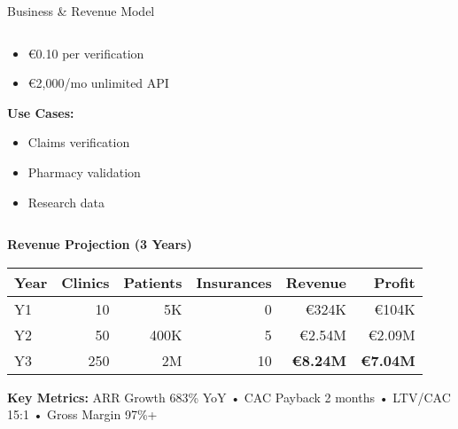 \documentclass[aspectratio=169,xcolor=dvipsnames,14pt]{beamer}
\newcommand{\checkitem}{\item[\color{SuccessGreen}\faCheckCircle]}
\begin{document}
\begin{frame}{Business \& Revenue Model}
\begin{columns}[T]
\begin{column}{0.33\textwidth}
      \begin{itemize}
        \item €0.10 per verification
        \item €2,000/mo unlimited API
      \end{itemize}

      \vspace{0.2cm}

      \textbf{Use Cases:}
      \begin{itemize}
        \checkitem Claims verification
        \checkitem Pharmacy validation
        \checkitem Research data
      \end{itemize}
    \end{column}
  \end{columns}

  \vspace{0.4cm}

  \textbf{\textcolor{FadjmaBlue}{Revenue Projection (3 Years)}}

  \begin{table}
    \small
    \begin{tabular}{lrrrrr}
      \toprule
      \textbf{Year} & \textbf{Clinics} & \textbf{Patients} & \textbf{Insurances} & \textbf{Revenue} & \textbf{Profit} \\
      \midrule
      Y1 & 10 & 5K & 0 & €324K & €104K \\
      Y2 & 50 & 400K & 5 & €2.54M & €2.09M \\
      Y3 & 250 & 2M & 10 & \textcolor{SuccessGreen}{\textbf{€8.24M}} & \textcolor{SuccessGreen}{\textbf{€7.04M}} \\
      \bottomrule
    \end{tabular}
  \end{table}

  \textbf{Key Metrics:} ARR Growth 683\% YoY • CAC Payback 2 months • LTV/CAC 15:1 • \textcolor{SuccessGreen}{Gross Margin 97\%+}

\end{frame}
\end{document}
